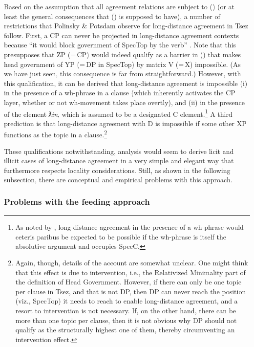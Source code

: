 \documentclass[output=paper
,modfonts
,nonflat]{langsci/langscibook}
\begin{document}
	Based on the assumption that all agreement relations are subject to
	(\LLast) (or at least the general consequences that (\LLast) is supposed
	to have), a number of restrictions that Polinsky \& Potsdam observe for
	long-distance agreement in Tsez follow. First, a CP can never be
	projected in long-distance agreement contexts because ``it would block
	government of SpecTop by the verb''
	\citep[638]{PolinskyPotsdam:01}. Note  that this presupposes that
	ZP (=\,CP) would indeed qualify as a barrier in (\Last) that makes
	head government of YP (=\,DP in SpecTop) by matrix V (=\,X)
	impossible. (As we have just seen, this consequence is far from
	straightforward.) However, with this qualification, it can be derived
	that long-distance agreement is impossible (i) in the presence of a
	wh-phrase in a clause (which inherently activates the CP layer,
	whether or not wh-movement takes place overtly), and (ii) in the
	presence of the element {\itshape ƛin}, which is assumed to be
	a designated C element.\footnote{\label{whabs}As noted by
		\citet[fn. 20]{PolinskyPotsdam:01}, long-distance agreement in the
		presence of a 
		wh-phrase would ceteris paribus be expected to be possible if the
		wh-phrase is itself the absolutive argument and occupies SpecC.}
	A third prediction is that long-distance
	agreement with D is impossible if some other XP functions as
	the topic in a clause.\footnote{Again, though, details of the account
		are somewhat unclear. One might think that this effect is due to
		intervention, i.e., the Relativized Minimality part of the
		definition of Head Government. However,  if there can only be one topic per clause in
		Tsez, and that is not DP, then DP can never reach the
		position (viz., SpecTop) it needs to reach to enable long-distance
		agreement, and a resort to intervention is not necessary. If, on the other hand, there can be more than one topic
		per clause, then it is not obvious why DP should not qualify
		as the structurally highest one of them, thereby circumventing an
		intervention effect.}
	
\noindent 	These qualifications notwithstanding, 
	analysis would seem to derive licit and illicit cases of long-distance
	agreement in a very simple and elegant way that furthermore respects
	locality considerations. Still, as shown in the following subsection,
	there are conceptual and empirical problems with this approach.
	
	
	\subsubsection{Problems with the feeding approach}	
	
\end{document}
